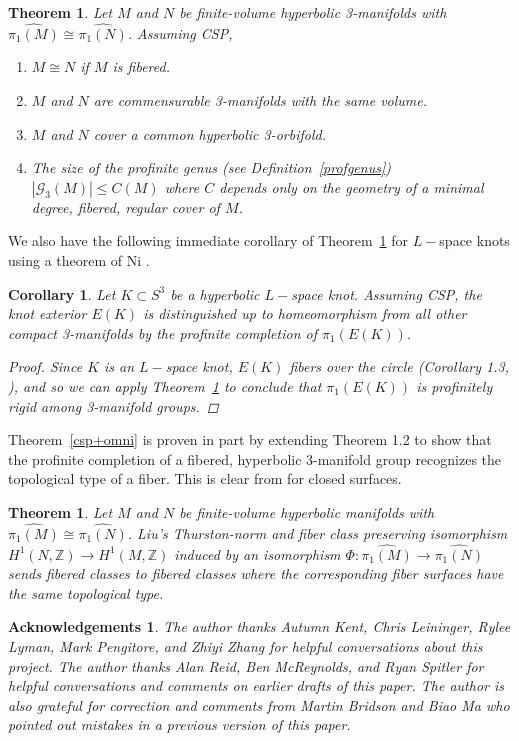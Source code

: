 \documentclass[12pt, reqno,oneside]{amsart}
\newtheorem{theorem}[lemma]{Theorem}
\newtheorem{cor}[lemma]{Corollary}
\theoremstyle{definition}
\newtheorem*{lem}{Acknowledgements}
\theoremstyle{plain}
\theoremstyle{TheoremNum}
\newcommand{\Z}{{\mathbb Z}}
\numberwithin{equation}{section}
\numberwithin{table}{section}
\begin{document}
\begin{theorem}\label{assumingIvanov2}
Let $M$ and $N$ be finite-volume hyperbolic 3-manifolds with $\widehat{\pi_1(M)}\cong\widehat{\pi_1(N)}$. Assuming CSP, 
\begin{enumerate}
    \item $M\cong N$ if $M$ is fibered. 
    \item $M$ and $N$ are commensurable 3-manifolds with the same volume. 
    \item $M$ and $N$ cover a common hyperbolic 3-orbifold.
    \item The size of the profinite genus (see Definition~\ref{profgenus}) $|\mathcal{G}_3(M)|\leq C(M)$ where $C$ depends only on the geometry of a minimal degree, fibered, regular cover of $M$.
\end{enumerate}
\end{theorem}
We also have the following immediate corollary of Theorem~\ref{assumingIvanov2} for $L-$space knots using a theorem of Ni \cite{Ni}.
\begin{cor}
    Let $K\subset S^3$ be a hyperbolic $L-$space knot. Assuming CSP, the knot exterior $E(K)$ is distinguished up to homeomorphism from all other compact 3-manifolds by the profinite completion of $\pi_1(E(K))$. 
    \begin{proof}
    Since $K$ is an $L-$space knot, $E(K)$ fibers over the circle (Corollary 1.3, \cite{Ni}), and so we can apply Theorem~\ref{assumingIvanov2} to conclude that $\pi_1(E(K))$ is profinitely rigid among 3-manifold groups.
    \end{proof}
\end{cor}
Theorem~\ref{csp+omni} is proven in part by extending Theorem 1.2 \cite{Y} to show that the profinite completion of a fibered, hyperbolic 3-manifold group recognizes the topological type of a fiber. This is clear from \cite{Y} for closed surfaces. 
\begin{theorem}\label{toptype}
 Let $M$ and $N$ be finite-volume hyperbolic manifolds with $\widehat{\pi_1(M)}\cong\widehat{\pi_1(N)}$. Liu's Thurston-norm and fiber class preserving isomorphism $H^1(N,\Z)\to H^1(M,\Z)$ induced by an isomorphism $\Phi:\widehat{\pi_1(M)}\to\widehat{\pi_1(N)}$ sends fibered classes to fibered classes where the corresponding fiber surfaces have the same topological type.
\end{theorem}
 


\begin{lem}
    {\it The author thanks Autumn Kent, Chris Leininger, Rylee Lyman, Mark Pengitore, and Zhiyi Zhang for helpful conversations about this project. The author thanks Alan Reid, Ben McReynolds, and Ryan Spitler for helpful conversations and comments on earlier drafts of this paper. The author is also grateful for correction and comments from Martin Bridson and Biao Ma who pointed out mistakes in a previous version of this paper.} 
\end{lem}
\end{document}
